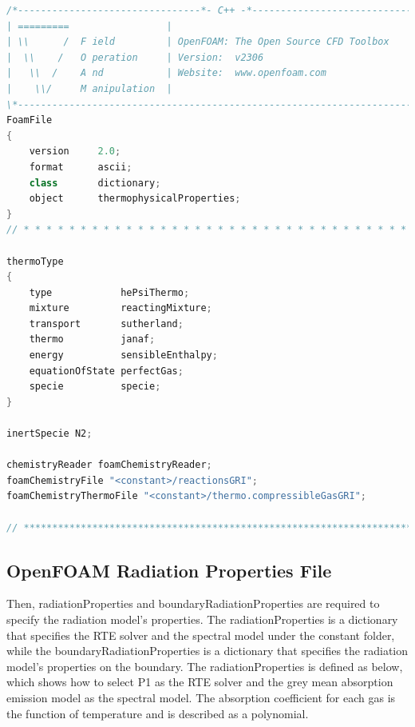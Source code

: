 \begin{lstlisting}[language=C++, caption={Thermophysical Properties File}]
/*--------------------------------*- C++ -*----------------------------------*\
| =========                 |                                                 |
| \\      /  F ield         | OpenFOAM: The Open Source CFD Toolbox           |
|  \\    /   O peration     | Version:  v2306                                 |
|   \\  /    A nd           | Website:  www.openfoam.com                      |
|    \\/     M anipulation  |                                                 |
\*---------------------------------------------------------------------------*/
FoamFile
{
    version     2.0;
    format      ascii;
    class       dictionary;
    object      thermophysicalProperties;
}
// * * * * * * * * * * * * * * * * * * * * * * * * * * * * * * * * * * * * * //

thermoType
{
    type            hePsiThermo;
    mixture         reactingMixture;
    transport       sutherland;
    thermo          janaf;
    energy          sensibleEnthalpy;
    equationOfState perfectGas;
    specie          specie;
}

inertSpecie N2;

chemistryReader foamChemistryReader;
foamChemistryFile "<constant>/reactionsGRI";
foamChemistryThermoFile "<constant>/thermo.compressibleGasGRI";

// ************************************************************************* //
\end{lstlisting}

\subsection*{OpenFOAM Radiation Properties File}
Then, radiationProperties and boundaryRadiationProperties are required to specify the radiation model’s properties. The radiationProperties is a dictionary that specifies the RTE solver and the spectral model under the constant folder, while the boundaryRadiationProperties is a dictionary that specifies the radiation model’s properties on the boundary. The radiationProperties is defined as below, which shows how to select P1 as the RTE solver and the grey mean absorption emission model as the spectral model. The absorption coefficient for each gas is the function of
temperature and is described as a polynomial. 

